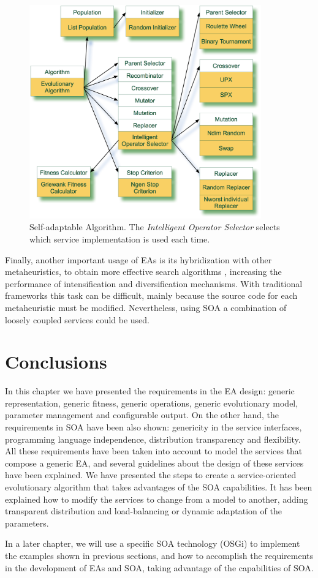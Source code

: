 \begin{figure}
\centering
\includegraphics[width=10cm]{gfx/soaea/intelligent.jpg}
\caption{Self-adaptable Algorithm. The {\em Intelligent Operator Selector} selects which service implementation is used each time.}
\label{INTELLIGENTALGORITHM}
\end{figure}


Finally, another important usage of EAs is its hybridization with other metaheuristics, to obtain more effective search algorithms \cite{HybridRodriguez2012},  increasing the performance of intensification and diversification mechanisms. With  traditional frameworks this task can be difficult, mainly because the source code for each metaheuristic must be modified. Nevertheless, using SOA a combination of loosely coupled services could be used.

\section{Conclusions}
In this chapter we have presented the requirements in the EA design: generic representation, generic fitness, generic operations, generic evolutionary model, parameter management and configurable output. On the other hand, the requirements in SOA have been also shown: genericity in the service interfaces, programming language independence, distribution transparency and flexibility. All these requirements have been taken into account to model the services that compose a generic EA, and several guidelines about the design of these services have been explained. We have presented the steps to create a service-oriented evolutionary algorithm that takes advantages of the SOA capabilities. It has been explained how to modify the services to change from a model to another, adding transparent distribution and load-balancing or dynamic adaptation of the parameters.

In a later chapter, we will use a specific SOA technology (OSGi) to implement the examples shown in previous sections, and how to accomplish the requirements in the development of EAs and SOA, taking advantage of the capabilities of SOA.


